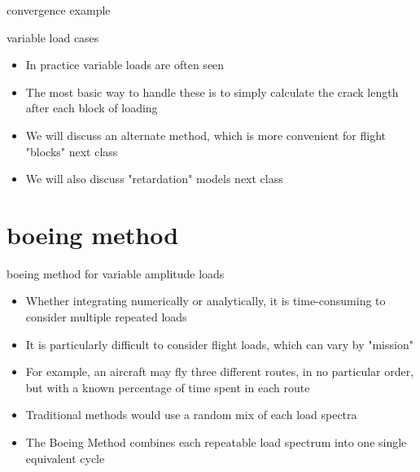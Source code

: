 \documentclass[10pt]{beamer}
\begin{document}
\begin{frame}{convergence example}
	
\end{frame}

\begin{frame}{variable load cases}
	\begin{itemize}[<+->]
		\item In practice variable loads are often seen
		\item The most basic way to handle these is to simply calculate the crack length after each block of loading
		\item We will discuss an alternate method, which is more convenient for flight "blocks" next class
		\item We will also discuss "retardation" models next class
	\end{itemize}
\end{frame}

\section{boeing method}

\begin{frame}{boeing method for variable amplitude loads}
	\begin{itemize}[<+->]
		\item Whether integrating numerically or analytically, it is time-consuming to consider multiple repeated loads
		\item It is particularly difficult to consider flight loads, which can vary by "mission"
		\item For example, an aircraft may fly three different routes, in no particular order, but with a known percentage of time spent in each route
		\item Traditional methods would use a random mix of each load spectra
		\item The Boeing Method combines each repeatable load spectrum into one single equivalent cycle
	\end{itemize}
\end{frame}
\end{document}
